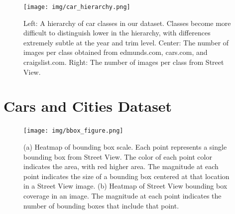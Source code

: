 \documentclass[10pt,twocolumn,letterpaper]{article}
\begin{document}

\begin{figure} [t]
\begin{center}
  \texttt{[image: img/car\_hierarchy.png]}
\end{center}
\caption {Left: A hierarchy of car classes in our dataset. Classes become more difficult to distinguish lower in the hierarchy, with differences extremely subtle at the year and trim level. Center: The number of images per class obtained from edmunds.com, cars.com, and craigslist.com. Right: The number of images per class from Street View.}
\label{fig:img_dist}
\end{figure}

\section{Cars and Cities Dataset}
\label{sec:data}
\begin{figure}[t]
\begin{center}
   \texttt{[image: img/bbox\_figure.png]}
\end{center}
   \caption{(a) Heatmap of bounding box scale. Each point represents a single bounding box from Street View. The color of each point color indicates the area, with red higher area. The magnitude at each point indicates the size of a bounding box centered at that location in a Street View image. (b) Heatmap of Street View bounding box coverage in an image. The magnitude at each point indicates the number of bounding boxes that include that point.}
\label{fig:loc-heat}
\end{figure}
\end{document}
